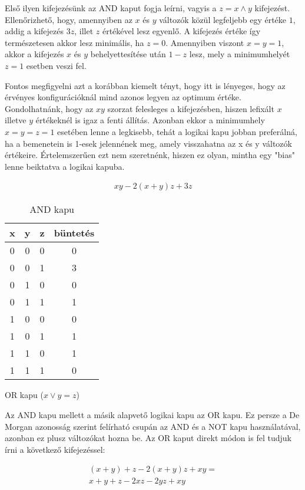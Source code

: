 Első ilyen kifejezésünk az AND kaput fogja leírni, vagyis a $z=x \wedge y$ kifejezést. Ellenőrizhető, hogy, amennyiben az $x$ és $y$ változók közül legfeljebb egy értéke $1$, addig a kifejezés $3z$, illet $z$ értékével lesz egyenlő. A kifejezés értéke így természetesen akkor lesz minimális, ha $z=0$. Amennyiben viszont $x=y=1$, akkor a kifejezés $x$ és $y$ behelyettesítése után $1-z$ lesz, mely a minimumhelyét $z=1$ esetben veszi fel.

Fontos megfigyelni azt a korábban kiemelt tényt, hogy itt is lényeges, hogy az érvényes konfigurációknál mind azonos legyen az optimum értéke. Gondolhatnánk, hogy az $xy$ szorzat felesleges a kifejezésben, hiszen lefixált $x$ illetve $y$ értékeknél is igaz a fenti állítás. Azonban ekkor a minimumhely $x=y=z=1$ esetében lenne a legkisebb, tehát a logikai kapu jobban preferálná, ha a bemenetein is 1-esek jelennének meg, amely visszahatna az x és y változók értékeire. Értelemszerűen ezt nem szeretnénk, hiszen ez olyan, mintha egy "bias" lenne beiktatva a logikai kapuba.



\begin{align}
	xy-2(x+y)z+3z
\end{align}

\begin{table}[ht]
	\footnotesize
	\centering
	\begin{tabular}{ c c c c }
		\toprule
		x & y & z & büntetés \\
		\midrule
		0 & 0 & 0 & 0 \\
		0 & 0 & 1 & 3 \\
		0 & 1 & 0 & 0 \\
		0 & 1 & 1 & 1 \\
		1 & 0 & 0 & 0 \\
		1 & 0 & 1 & 1 \\
		1 & 1 & 0 & 1 \\
		1 & 1 & 1 & 0 \\		
		\bottomrule
	\end{tabular}
	\caption{AND kapu}
	\label{tab:ANDgate}
\end{table}

OR kapu ($x \vee y = z$)

Az AND kapu mellett a másik alapvető logikai kapu az OR kapu. Ez persze a De Morgan azonosság szerint felírható csupán az AND és a NOT kapu használatával, azonban ez plusz változókat hozna be. Az OR kaput direkt módon is fel tudjuk írni a következő kifejezéssel: 

\begin{align}
	(x+y)+z-2(x+y)z+xy = \\
	x+y+z-2xz-2yz+xy
\end{align}

